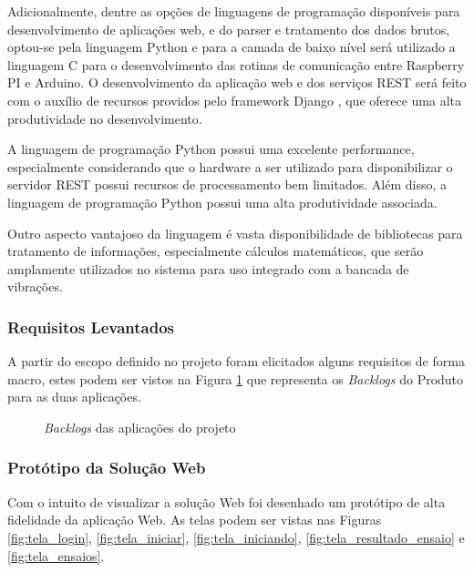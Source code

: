 Adicionalmente, dentre as opções de linguagens de programação disponíveis para desenvolvimento de aplicações web, e do parser e tratamento dos dados brutos, optou-se pela linguagem Python e para a camada de baixo nível será utilizado a linguagem C para o desenvolvimento  das rotinas de comunicação entre Raspberry PI e Arduino. O desenvolvimento da aplicação web e dos serviços REST será feito com o auxílio de recursos providos pelo framework Django \footnotemark, que oferece uma alta produtividade no desenvolvimento.

A linguagem de programação Python possui uma excelente performance, especialmente considerando que o hardware a ser utilizado para disponibilizar o servidor REST possui recursos de processamento bem limitados. Além disso, a linguagem de programação Python possui uma alta produtividade associada.

Outro aspecto vantajoso da linguagem é vasta disponibilidade de bibliotecas para tratamento de informações, especialmente cálculos matemáticos, que serão amplamente utilizados no sistema para uso integrado com a bancada de vibrações.

\subsubsection*{\textbf{Requisitos Levantados}}
A partir do escopo definido no projeto foram elicitados alguns requisitos de forma macro, estes podem ser vistos na Figura \ref{backlog_produto} que representa os \textit{Backlogs} do Produto para as duas aplicações.

\begin{figure}[!h]    
\centering
\label{backlog_produto}	
\caption{\textit{Backlogs} das aplicações do projeto}
\end{figure} 

\subsubsection*{\textbf{Protótipo da Solução Web}}

Com o intuito de visualizar a solução Web foi desenhado um protótipo de alta fidelidade da aplicação Web. As telas podem ser vistas nas Figuras \ref{fig:tela_login}, \ref{fig:tela_iniciar}, \ref{fig:tela_iniciando}, \ref{fig:tela_resultado_ensaio} e \ref{fig:tela_ensaios}.


